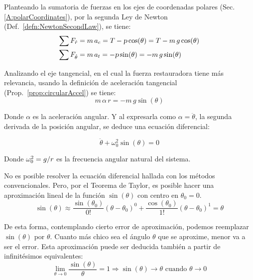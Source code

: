 \begin{center}
    \def\svgwidth{\linewidth}
    
\end{center}

Planteando la sumatoria de fuerzas en los ejes de coordenadas polares (Sec. \ref{A:polarCoordinates}), por la segunda Ley de Newton (Def.\ \ref{defn:NewtonSecondLaw}), se tiene:
\begin{align*}
    \sum F_{\hat{r}} &= m \, a_c = T - \textsl{p} \cos(\theta) = T - m \, g \cos(\theta)
    \\
    \sum F_{\hat{\theta}} &= m \, a_t = - \textsl{p} \sin(\theta) = - m \, g \sin(\theta)
\end{align*}

Analizando el eje tangencial, en el cual la fuerza restauradora tiene más relevancia, usando la definición de aceleración tangencial (Prop.\ \ref{prop:circularAccel}) se tiene:
\[ m \, \alpha \, r = - m \, g \sin(\theta) \]

Donde $\alpha$ es la aceleración angular.
Y al expresarla como $\alpha = \ddot{\theta}$, la segunda derivada de la posición angular, se deduce una ecuación diferencial:

\begin{mdframed}[style=DefinitionFrame]
    \begin{defn}
    \end{defn}
    \begin{equation*}
        \ddot{\theta} + \omega_0^2 \sin(\theta) = 0
    \end{equation*}
\end{mdframed}

Donde $\omega_0^2=g/r$ es la frecuencia angular natural del sistema.

No es posible resolver la ecuación diferencial hallada con los métodos convencionales.
Pero, por el Teorema de Taylor, es posible hacer una aproximación lineal de la función $\sin{(\theta)}$ con centro en $\theta_0 = 0$.
\[
  \sin(\theta) \approx \frac{\sin(\theta_0)}{0!} \left( \theta-\theta_0 \right)^0 + \frac{\cos(\theta_0)}{1!} \left( \theta-\theta_0 \right)^1 = \theta
\]

De esta forma, contemplando cierto error de aproximación, podemos reemplazar $\sin{(\theta)}$ por $\theta$.
Cuanto más chico sea el ángulo $\theta$ que se aproxime, menor va a ser el error.
Esta aproximación puede ser deducida también a partir de infinitésimos equivalentes:
\[
  \lim_{\theta \to 0} \frac{\sin(\theta)}{\theta} = 1 \Rightarrow \sin(\theta) \to \theta \text{ cuando } \theta \to 0
\]

